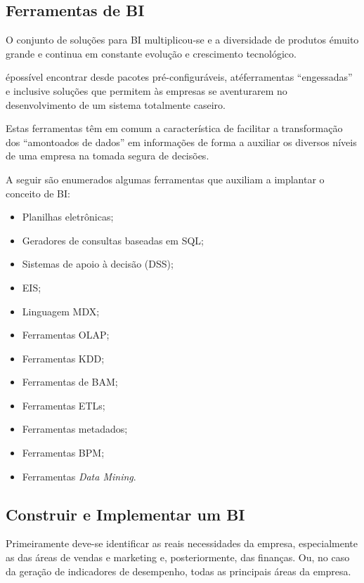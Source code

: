 \subsection{Ferramentas de BI}

O conjunto de solu\c{c}\~{o}es para BI multiplicou-se e a diversidade de produtos \'{e}muito grande e continua em constante evolu\c{c}\~{a}o e crescimento tecnol\'{o}gico.

\'{e}poss\'{i}vel encontrar desde pacotes pr\'{e}-configur\'{a}veis, at\'{e}ferramentas “engessadas” e inclusive solu\c{c}\~{o}es que permitem \`{a}s empresas se aventurarem no desenvolvimento de um sistema totalmente caseiro.

Estas ferramentas têm em comum a caracter\'{i}stica de facilitar a transforma\c{c}\~{a}o dos “amontoados de dados” em informa\c{c}\~{o}es de forma a auxiliar os diversos n\'{i}veis de uma empresa na tomada segura de decis\~{o}es.

A seguir s\~{a}o enumerados algumas ferramentas que auxiliam a implantar o conceito de BI:

\begin{itemize}
    \item Planilhas eletrônicas;
    \item Geradores de consultas baseadas em SQL;
    \item Sistemas de apoio \`{a} decis\~{a}o (DSS);
    \item EIS;
    \item Linguagem MDX;
    \item Ferramentas OLAP;
    \item Ferramentas KDD;
    \item Ferramentas de BAM;
    \item Ferramentas ETLs;
    \item Ferramentas metadados;
    \item Ferramentas BPM;
    \item Ferramentas \textit{Data Mining}.
\end{itemize}

\subsection{Construir e Implementar um BI}

Primeiramente deve-se identificar as reais necessidades da empresa, especialmente as das \'{a}reas de vendas e marketing e, posteriormente, das finan\c{c}as. Ou, no caso da gera\c{c}\~{a}o de indicadores de desempenho, todas as principais \'{a}reas da empresa. 

